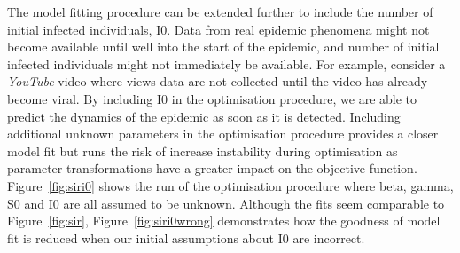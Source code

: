 The model fitting procedure can be extended further to include the
number of initial infected individuals, I0. Data from real epidemic
phenomena might not become available until well into the start of the epidemic, and number of initial infected individuals might not immediately
be available. For example, consider a \emph{YouTube} video where views
data are not collected until the video has already become viral. By
including I0 in the optimisation procedure, we
are able to predict the dynamics of the epidemic as soon as it is
detected. Including additional unknown parameters in the
optimisation procedure provides a closer model fit but runs the risk
of increase instability during optimisation as parameter
transformations have a greater impact on the objective
function. Figure~\ref{fig:siri0} shows the run of the optimisation procedure where
beta, gamma, S0 and I0 are all assumed to be unknown. Although the
fits seem comparable to Figure~\ref{fig:sir}, Figure~\ref{fig:siri0wrong} demonstrates how the
goodness of model fit is reduced when our initial assumptions about I0
are incorrect.

